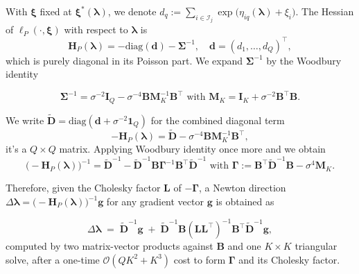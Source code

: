 With $\bm{\xi}$ fixed at $\bm{\xi}^{*}(\bm{\lambda})$, we denote $d_{q}:=\sum_{i\in \mathcal{I}_{j}}\exp{\bigl(\eta_{iq}(\bm{\lambda})+\xi_{i}\bigr)}$. The Hessian of $\ell_{P}(\cdot, \bm{\xi})$ with respect to $\bm{\lambda}$ is 
\begin{equation}
    \mathbf{H}_{P}(\bm{\lambda})=-\text{diag}(\mathbf{d})-\bm{\Sigma}^{-1}, \quad \mathbf{d}=(d_{1},\dots, d_{Q})^{\top},
    \label{eq:acceleration-hessian1}
\end{equation}
which is purely diagonal in its Poisson part. We expand $\bm{\Sigma}^{-1}$ by the Woodbury identity

\begin{equation}
    \bm{\Sigma}^{-1}=\sigma^{-2}\mathbf{I}_{Q}-\sigma^{-4}\mathbf{BM}_{K}^{-1}\mathbf{B}^{\top} \text{ with } \mathbf{M}_{K}=\mathbf{I}_{K}+\sigma^{-2}\mathbf{B}^{\top}\mathbf{B}.
    \label{eq:woodbury2}
\end{equation}

We write $\tilde{\mathbf{D}}=\text{diag}(\mathbf{d}+\sigma^{-2}\mathbf{1}_{Q})$ for the combined diagonal term
\begin{equation}
    -\mathbf{H}_{P}(\bm{\lambda})=\tilde{\mathbf{D}}-\sigma^{-4}\mathbf{BM}_{K}^{-1}\mathbf{B}^{\top},
    \label{eq:acceleration-hessian3}
\end{equation}
it's a $Q\times Q$ matrix. Applying Woodbury identity once more and we obtain
\begin{equation}
    \bigl(-\mathbf{H}_{P}(\bm{\lambda})\bigr)^{-1}=\tilde{\mathbf{D}}^{-1}-\tilde{\mathbf{D}}^{-1}\mathbf{B}\bm{\Gamma}^{-1}\mathbf{B}^{\top}\tilde{\mathbf{D}}^{-1} \text{ with } \bm{\Gamma}:=\mathbf{B}^{\top}\tilde{\mathbf{D}}^{-1}\mathbf{B}-\sigma^{4}\mathbf{M}_{K}.
    \label{eq:inverse-hessian4}
\end{equation}

Therefore, given the Cholesky factor $\mathbf{L}$ of $-\bm{\Gamma}$, a Newton direction $\Delta\bm{\lambda}=\bigl(-\mathbf{H}_{P}(\bm{\lambda})\bigr)^{-1}\mathbf{g}$ for any gradient vector $\mathbf{g}$ is obtained as

\begin{equation}
    \Delta\boldsymbol{\lambda} \;=\; \tilde{\mathbf{D}}^{-1}\mathbf{g} \;+\; \tilde{\mathbf{D}}^{-1}\mathbf{B}(\mathbf{L}\mathbf{L}^\top)^{-1}\mathbf{B}^\top\tilde{\mathbf{D}}^{-1}\mathbf{g},
    \label{eq:newton-direction5}
\end{equation}
computed by two matrix-vector products against $\mathbf{B}$ and one $K\times K$ triangular solve, after a one-time $\mathcal{O}(QK^{2}+K^{3})$ cost to form $\bm{\Gamma}$ and its Cholesky factor.

